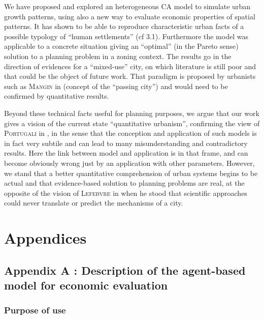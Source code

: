 \documentclass[a4paper,twocolumn,twoside,10pt]{article}
\newcommand{\noun}[1]{\textsc{#1}}
\begin{document}
We have proposed and explored an heterogeneous CA model to simulate
urban growth patterns, using also a new way to evaluate economic properties
of spatial patterns. It has shown to be able to reproduce characteristic
urban facts of a possible typology of ``human settlements'' (cf
3.1). Furthermore the model was applicable to a concrete situation
giving an ``optimal'' (in the Pareto sense) solution to a planning
problem in a zoning context. The results go in the direction of evidences
for a ``mixed-use'' city, on which literature is still poor and
that could be the object of future work. That paradigm is proposed
by urbanists such as \noun{Mangin} in \cite{mangin2004ville} (concept
of the ``passing city'') and would need to be confirmed by quantitative
results.

Beyond these technical facts useful for planning purposes, we argue
that our work gives a vision of the current state ``quantitative
urbanism'', confirming the view of \noun{Portugali} in \cite{portugali2012complexity},
in the sense that the conception and application of such models is
in fact very subtile and can lead to many misunderstanding and contradictory
results. Here the link between model and application is in that frame,
and can become obviously wrong just by an application with other parameters.
However, we stand that a better quantitative comprehension of urban
systems begins to be actual and that evidence-based solution to planning
problems are real, at the opposite of the vision of \noun{Lefebvre}
in \cite{henri1968droit} when he stood that scientific approaches
could never translate or predict the mechanisms of a city.







\section*{Appendices}

\subsection*{Appendix A : Description of the agent-based model for economic evaluation}

\subsubsection*{Purpose of use}
\end{document}
